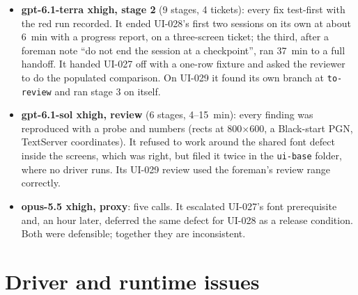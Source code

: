 \documentclass[11pt,a4paper]{article}
\begin{document}
\begin{itemize}
  \item \textbf{gpt-6.1-terra xhigh, stage 2} (9 stages, 4 tickets): every fix test-first with
        the red run recorded. It ended UI-028's first two sessions on its own at about 6~min with a
        progress report, on a three-screen ticket; the third, after a foreman note ``do not end the
        session at a checkpoint'', ran 37~min to a full handoff. It handed UI-027 off with a
        one-row fixture and asked the reviewer to do the populated comparison. On UI-029 it found
        its own branch at \texttt{to-review} and ran stage 3 on itself.
  \item \textbf{gpt-6.1-sol xhigh, review} (6 stages, 4--15~min): every finding was reproduced
        with a probe and numbers (rects at 800$\times$600, a Black-start PGN, TextServer
        coordinates). It refused to work around the shared font defect inside the screens, which
        was right, but filed it twice in the \texttt{ui-base} folder, where no driver runs. Its
        UI-029 review used the foreman's review range correctly.
  \item \textbf{opus-5.5 xhigh, proxy}: five calls. It escalated UI-027's font prerequisite and,
        an hour later, deferred the same defect for UI-028 as a release condition. Both were
        defensible; together they are inconsistent.
\end{itemize}

\section*{Driver and runtime issues}
\end{document}
